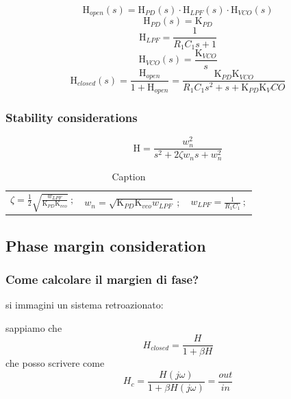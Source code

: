 

\begin{equation}
    \text{H}_{open}(s)=\text{H}_{PD}(s) \cdot \text{H}_{LPF}(s) \cdot \text{H}_{VCO}(s)
\end{equation}
\begin{equation}
    \text{H}_{PD}(s)=\text{K}_{PD}
\end{equation}
\begin{equation}
    \text{H}_{LPF}=\frac{1}{R_1C_1s+1}
\end{equation}
\begin{equation}
    \text{H}_{VCO}(s)=\frac{\text{K}_{VCO}}{s}
\end{equation}
\begin{equation}
    \text{H}_{closed}(s)=\frac{\text{H}_{open}}{1+\text{H}_{open}}=\frac{\text{K}_{PD}\text{K}_{VCO}}{R_1C_1s^2+s+\text{K}_{PD}\text{K}_VCO}
\end{equation}
\subsubsection{Stability considerations}
\begin{equation}
    \text{H}=\frac{w_n^2}{s^2+2\zeta w_n s +w_n^2}
\end{equation}

\begin{table}
    \centering
    \begin{tabular}{ccc}
        \(\displaystyle \zeta = \frac{1}{2} \sqrt{\frac{w_{LPF}}{\text{K}_{PD} \text{K}_{vco}}} \ ;\) & 
        \(\displaystyle w_n = \sqrt{\text{K}_{PD} \text{K}_{vco} w_{LPF}} \ ; \) 
        & 
        \(\displaystyle w_{LPF} = \frac{1}{R_1 C_1} \ ; \) \\
    \end{tabular}
    \caption{Caption}
    \label{tab:my_label}
\end{table}
\subsection{Phase margin consideration}
\subsubsection{Come calcolare il margien di fase?}
si immagini un sistema retroazionato:
\begin{figure}
    
\end{figure}
sappiamo che 
\begin{equation}
    H_{closed} =\frac{H}{1+\beta H}
\end{equation}
che posso scrivere come
\begin{equation}
    H_{c} =\frac{H(j\omega)}{1+\beta H(j\omega)}=\frac{out}{in}
\end{equation}

